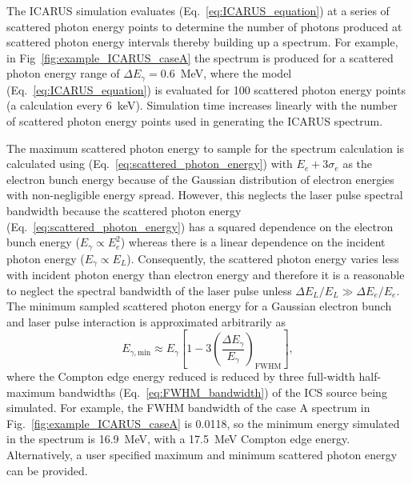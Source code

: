\documentclass[../main.tex]{subfiles}
\begin{document}
The \textsc{ICARUS} simulation evaluates (Eq.~\ref{eq:ICARUS_equation}) at a series of scattered photon energy points to determine the number of photons produced at scattered photon energy intervals thereby building up a spectrum. For example, in Fig~\ref{fig:example_ICARUS_caseA} the spectrum is produced for a scattered photon energy range of $\Delta E_{\gamma} = 0.6$~\si{\mega\electronvolt}, where the model (Eq.~\ref{eq:ICARUS_equation}) is evaluated for 100 scattered photon energy points (a calculation every 6~\si{\kilo\electronvolt}). Simulation time increases linearly with the number of scattered photon energy points used in generating the \textsc{ICARUS} spectrum.

The maximum scattered photon energy to sample for the spectrum calculation is calculated using (Eq.~\ref{eq:scattered_photon_energy}) with $E_{e}+3\sigma_{e}$ as the electron bunch energy because of the Gaussian distribution of electron energies with non-negligible energy spread. However, this neglects the laser pulse spectral bandwidth because the scattered photon energy (Eq.~\ref{eq:scattered_photon_energy}) has a squared dependence on the electron bunch energy ($E_{\gamma}\propto E_{e}^{2}$) whereas there is a linear dependence on the incident photon energy ($E_{\gamma}\propto E_{L}$). Consequently, the scattered photon energy varies less with incident photon energy than electron energy and therefore it is a reasonable to neglect the spectral bandwidth of the laser pulse unless $\Delta E_{L}/E_{L} \gg \Delta E_{e}/E_{e}$. The minimum sampled scattered photon energy for a Gaussian electron bunch and laser pulse interaction is approximated arbitrarily as
\begin{equation}
E_{\gamma,\mathrm{min}} \approx E_{\gamma}\left[1-3\left(\frac{\Delta E_{\gamma}}{E_{\gamma}}\right)_{\mathrm{FWHM}}\right],
\label{eq:ICARUS_minimum_energy}
\end{equation}
where the Compton edge energy reduced is reduced by three full-width half-maximum bandwidths (Eq.~\ref{eq:FWHM_bandwidth}) of the ICS source being simulated. For example, the FWHM bandwidth of the case A spectrum in Fig.~\ref{fig:example_ICARUS_caseA} is 0.0118, so the minimum energy simulated in the spectrum is 16.9~\si{\mega\electronvolt}, with a 17.5~\si{\mega\electronvolt} Compton edge energy. Alternatively, a user specified maximum and minimum scattered photon energy can be provided.
\end{document}
